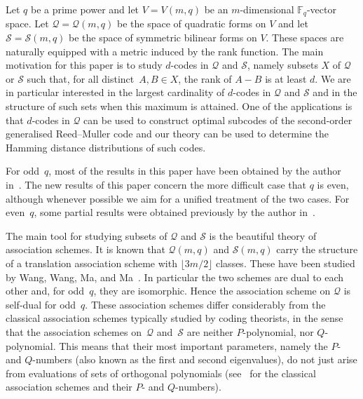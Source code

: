 \documentclass[10pt]{article}
\theoremstyle{definition}
\newcommand{\FF}{\mathbb{F}}
\newcommand{\Q}{\mathscr{Q}}
\renewcommand{\S}{\mathscr{S}}
\newcommand{\floor}[1]{\lfloor#1\rfloor}
\begin{document}
Let $q$ be a prime power and let $V=V(m,q)$ be an $m$-dimensional $\FF_q$-vector space. Let $\Q=\Q(m,q)$ be the space of quadratic forms on $V$ and let $\S=\S(m,q)$ be the space of symmetric bilinear forms on $V$. These spaces are naturally equipped with a metric induced by the rank function. The main motivation for this paper is to study $d$-codes in $\Q$ and $\S$, namely subsets $X$ of $\Q$ or $\S$ such that, for all distinct~$A,B\in X$, the rank of $A-B$ is at least $d$. We are in particular interested in the largest cardinality of $d$-codes in $\Q$ and $\S$ and in the structure of such sets when this maximum is attained. One of the applications is that $d$-codes in $\Q$ can be used to construct optimal subcodes of the second-order generalised Reed--Muller code and our theory can be used to determine the Hamming distance distributions of such codes.
\par
For odd~$q$, most of the results in this paper have been obtained by the author in~\cite{Sch2015}. The new results of this paper concern the more difficult case that $q$ is even, although whenever possible we aim for a unified treatment of the two cases.  For even~$q$, some partial results were obtained previously by the author in~\cite{Sch2010}.
\par
The main tool for studying subsets of $\Q$ and $\S$ is the beautiful theory of association schemes. It is known that $\Q(m,q)$ and $\S(m,q)$ carry the structure of a translation association scheme with $\floor{3m/2}$ classes. These have been studied by Wang, Wang, Ma, and Ma~\cite{WanWanMaMa2003}. In particular the two schemes are dual to each other and, for odd~$q$, they are isomorphic. Hence the association scheme on $\Q$ is self-dual for odd~$q$. These association schemes differ considerably from the classical association schemes typically studied by coding theorists, in the sense that the association schemes on~$\Q$ and~$\S$ are neither $P$-polynomial, nor $Q$-polynomial. This means that their most important parameters, namely the $P$- and $Q$-numbers (also known as the first and second eigenvalues), do not just arise from evaluations of sets of orthogonal polynomials (see~\cite{Del1976,Sta1980,Sta1981} for the classical association schemes and their $P$- and $Q$-numbers).
\par
\end{document}
